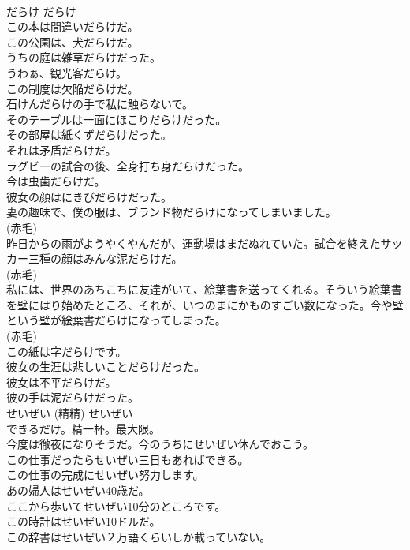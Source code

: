 \documentclass[8pt]{extreport}
\begin{document}
\begin{CJK}{UTF8}{min}
\\	だらけ	だらけ	
\\	この本は間違いだらけだ。   
\\	この公園は、犬だらけだ。  
\\	うちの庭は雑草だらけだった。  
\\	うわぁ、観光客だらけ。  
\\	この制度は欠陥だらけだ。  
\\	石けんだらけの手で私に触らないで。  
\\	そのテーブルは一面にほこりだらけだった。  
\\	その部屋は紙くずだらけだった。  
\\	それは矛盾だらけだ。  
\\	ラグビーの試合の後、全身打ち身だらけだった。  
\\	今は虫歯だらけだ。  
\\	彼女の顔はにきびだらけだった。  
\\	妻の趣味で、僕の服は、ブランド物だらけになってしまいました。  
\\	(赤毛)
\\	昨日からの雨がようやくやんだが、運動場はまだぬれていた。試合を終えたサッカー三種の顔はみんな泥だらけだ。  
\\	(赤毛)
\\	私には、世界のあちこちに友達がいて、絵葉書を送ってくれる。そういう絵葉書を壁にはり始めたところ、それが、いつのまにかものすごい数になった。今や壁という壁が絵葉書だらけになってしまった。  
\\	(赤毛)
\\	この紙は字だらけです。  
\\	彼女の生涯は悲しいことだらけだった。  
\\	彼女は不平だらけだ。  
\\	彼の手は泥だらけだった。  
\\	せいぜい (精精)	せいぜい	
\\	できるだけ。精一杯。最大限。	
\\	今度は徹夜になりそうだ。今のうちにせいぜい休んでおこう。  
\\	この仕事だったらせいぜい三日もあればできる。  
\\	この仕事の完成にせいぜい努力します。  
\\	あの婦人はせいぜい40歳だ。  
\\	ここから歩いてせいぜい10分のところです。  
\\	この時計はせいぜい10ドルだ。  
\\	この辞書はせいぜい２万語くらいしか載っていない。  

\end{CJK}
\end{document}
